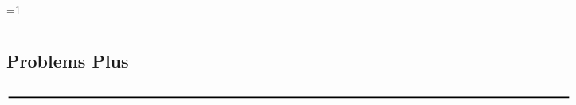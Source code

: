 \documentclass{sebase}
\begin{document}
\def\dint{\displaystyle \int}\def\diint{\displaystyle \iint}\def\diiint{\displaystyle \iiint}
\def\tint{\textstyle \int}\def\tiint{\textstyle \iint }\def\tiiint{{\textstyle \iiint }\def\tiiiint{\textstyle \iiiint }}%
\noCCC%
\renewcommand{\ET}{1}%
\renewcommand{\RM}{0}%
\renewcommand{\RM}{1}%
\ifnum\RM=1 \setcounter{page}{96}\else \setcounter{page}{77}\fi%
$\,\,$

\chapter[Problems Plus]{}

\section[Problems Plus]{Problems Plus\vspace*{-21pt}}

\vspace{12pt}\hskip-160pt\hfil%
\vspace{-6pt}$\rule{7in}{0.02in}$%
\vspace{12pt}\hfil%
\vspace*{-9pt}
\end{document}
